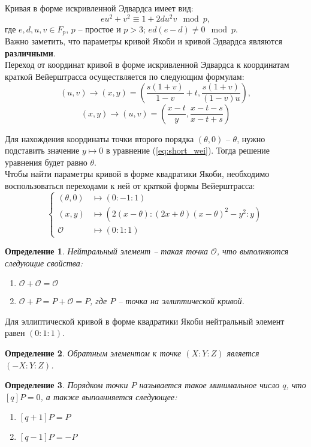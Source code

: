 \documentclass[a4paper,12pt]{article}
\newtheorem{definition}{Определение}[section]
\begin{document}
	Кривая в форме искривленной Эдвардса имеет вид: \[ eu^2+v^2\equiv 1+2du^2v \mod p,\]
	где $e, d, u, v \in F_p$, $p$ -- простое и $p>3$; $ed(e-d)\neq 0 \mod p$.\\
	Важно заметить, что параметры кривой Якоби и кривой Эдвардса являются \textbf{различными}.\\
	
	Переход от координат кривой в форме искривленной Эдвардса к координатам краткой Вейерштрасса осуществляется по следующим формулам:
	\[ (u, v)\rightarrow (x, y) = \left(\frac{s(1+v)}{1-v}+t, \frac{s(1+v)}{(1-v)u}\right),\]
	\[(x, y)\rightarrow (u, v) = \left(\frac{x-t}{y}, \frac{x-t-s}{x-t+s}\right)\]
	
	Для нахождения координаты точки второго порядка $(\theta, 0)$ -- $\theta$, нужно подставить значение $y\mapsto0$ в уравнение (\ref{eq:short_wei}). Тогда решение уравнения будет равно $\theta$.\\
	
	Чтобы найти параметры кривой в форме квадратики Якоби, необходимо воспользоваться переходами к ней от краткой формы Вейерштрасса:
	\begin{equation*}
		\begin{cases}
			(\theta, 0)&\longmapsto (0 : -1 : 1)\\
			(x, y)&\longmapsto (2(x-\theta) : (2x+\theta)(x-\theta)^2-y^2 : y)\\
			\mathcal{O}& \longmapsto (0 : 1 : 1)
		\end{cases}
	\end{equation*}
	\begin{definition}
		Нейтральный элемент -- такая точка $\mathcal{O}$, что выполняются следующие свойства:
		\begin{enumerate}
			\item $\mathcal{O} +\mathcal{O}=\mathcal{O}$
			\item $\mathcal{O}+P=P+\mathcal{O}=P$, где $P$ -- точка на эллиптической кривой.
		\end{enumerate}
	\end{definition}

	Для эллиптической кривой в форме квадратики Якоби нейтральный элемент равен $(0 : 1 : 1)$.\\

	\begin{definition}
		Обратным элементом к точке $(X : Y : Z)$ является $(-X : Y : Z)$.
	\end{definition}	
	\begin{definition}
		Порядком точки $P$ называется такое минимальное число $q$, что $[q]P=0$, а также выполнняется следующее:
		\begin{enumerate}
			\item $[q+1]P=P$
			\item $[q-1]P=-P$
		\end{enumerate}
	\end{definition}
\end{document}
